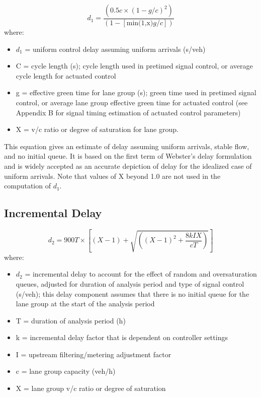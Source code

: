 \begin{equation*}
    d_1 =\frac{(0.5c\times(1-g/c)^2)}{(1-[\text{min(1,x)}g/c])}
\end{equation*}
where:
\begin{itemize}
    \item $d_1$ = uniform control delay assuming uniform arrivals (s/veh)
    \item C = cycle length (s); cycle length used in pretimed signal control, or average cycle length for actuated control
    \item g = effective green time for lane group (s); green time used in pretimed signal control, or average lane group effective green time for actuated control (see Appendix B for signal timing estimation of actuated control parameters)
    \item X = v/c ratio or degree of saturation for lane group.
\end{itemize}
This equation gives an estimate of delay assuming uniform 
arrivals, stable flow, and no initial queue. It is based on 
the first term of Webster’s delay formulation and is widely 
accepted as an accurate depiction of delay for the idealized 
case of uniform arrivals. Note that values of X beyond 1.0 
are not used in the computation of $d_1$.

\subsection{Incremental Delay}

\begin{equation*}
    d_2=900T\times[(X-1)+\sqrt{((X-1)^2 + \frac{8kIX}{cT})}]
\end{equation*}
where:
\begin{itemize}
    \item $d_2$ = incremental delay to account for the effect of random and oversaturation queues, adjusted for duration of analysis period and type of signal control (s/veh); this delay component assumes that there is no initial queue for the lane group at the start of the analysis period
    \item T = duration of analysis period (h)
    \item k = incremental delay factor that is dependent on controller settings
    \item I = upstream filtering/metering adjustment factor
    \item c = lane group capacity (veh/h)
    \item X = lane group v/c ratio or degree of saturation
\end{itemize}

